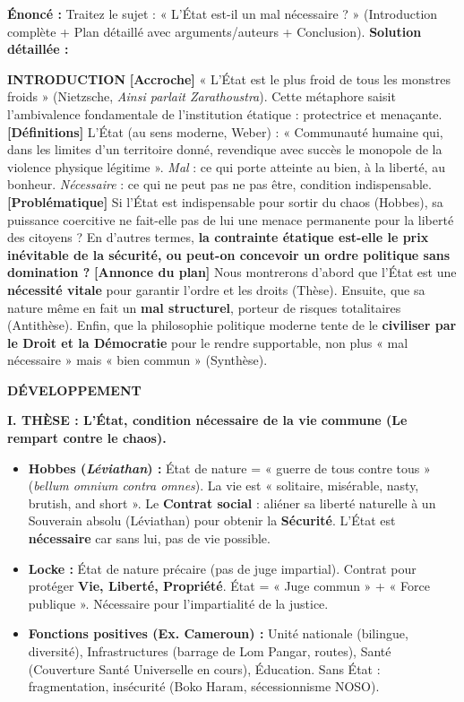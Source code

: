 \documentclass[11pt]{article}
\begin{document}
\begin{exoresolu}
\textbf{Énoncé :} Traitez le sujet : « L'État est-il un mal nécessaire ? » (Introduction complète + Plan détaillé avec arguments/auteurs + Conclusion).
\tcblower
\textbf{Solution détaillée :}

\textbf{INTRODUCTION}
\textbf{[Accroche]} « L'État est le plus froid de tous les monstres froids » (Nietzsche, \emph{Ainsi parlait Zarathoustra}). Cette métaphore saisit l'ambivalence fondamentale de l'institution étatique : protectrice et menaçante.
\textbf{[Définitions]} L'État (au sens moderne, Weber) : « Communauté humaine qui, dans les limites d'un territoire donné, revendique avec succès le monopole de la violence physique légitime ». \emph{Mal} : ce qui porte atteinte au bien, à la liberté, au bonheur. \emph{Nécessaire} : ce qui ne peut pas ne pas être, condition indispensable.
\textbf{[Problématique]} Si l'État est indispensable pour sortir du chaos (Hobbes), sa puissance coercitive ne fait-elle pas de lui une menace permanente pour la liberté des citoyens ? En d'autres termes, \textbf{la contrainte étatique est-elle le prix inévitable de la sécurité, ou peut-on concevoir un ordre politique sans domination ?}
\textbf{[Annonce du plan]} Nous montrerons d'abord que l'État est une \textbf{nécessité vitale} pour garantir l'ordre et les droits (Thèse). Ensuite, que sa nature même en fait un \textbf{mal structurel}, porteur de risques totalitaires (Antithèse). Enfin, que la philosophie politique moderne tente de le \textbf{civiliser par le Droit et la Démocratie} pour le rendre supportable, non plus « mal nécessaire » mais « bien commun » (Synthèse).

\textbf{DÉVELOPPEMENT}

\textbf{I. THÈSE : L'État, condition nécessaire de la vie commune (Le rempart contre le chaos).}
\begin{itemize}
    \item \textbf{Hobbes (\emph{Léviathan}) :} État de nature = « guerre de tous contre tous » (\emph{bellum omnium contra omnes}). La vie est « solitaire, misérable, nasty, brutish, and short ». Le \textbf{Contrat social} : aliéner sa liberté naturelle à un Souverain absolu (Léviathan) pour obtenir la \textbf{Sécurité}. L'État est \textbf{nécessaire} car sans lui, pas de vie possible.
    \item \textbf{Locke :} État de nature précaire (pas de juge impartial). Contrat pour protéger \textbf{Vie, Liberté, Propriété}. État = « Juge commun » + « Force publique ». Nécessaire pour l'impartialité de la justice.
    \item \textbf{Fonctions positives (Ex. Cameroun) :} Unité nationale (bilingue, diversité), Infrastructures (barrage de Lom Pangar, routes), Santé (Couverture Santé Universelle en cours), Éducation. Sans État : fragmentation, insécurité (Boko Haram, sécessionnisme NOSO).
\end{itemize}


\end{exoresolu}
\end{document}
